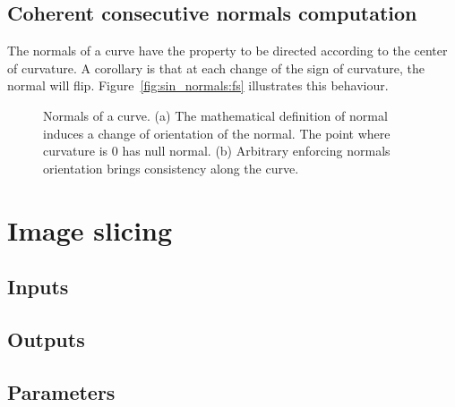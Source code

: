 \documentclass{InsightArticle}
\begin{document}
\subsection{Coherent consecutive normals computation}
%
The normals of a curve have the property to be directed according to the 
center of curvature. A corollary is that at each change of the sign of 
curvature, the normal will flip. Figure~\ref{fig:sin_normals:fs} illustrates
this behaviour.
%
\begin{figure}
\caption{Normals of a curve. (a) The mathematical definition of normal induces
a change of orientation of the normal. The point where curvature is $0$ has 
null normal. (b) Arbitrary enforcing normals orientation brings consistency
along the curve.}
\end{figure}
%
\section{Image slicing}
%
\subsection{Inputs}
%
\subsection{Outputs}
%
\subsection{Parameters}
%
\end{document}

